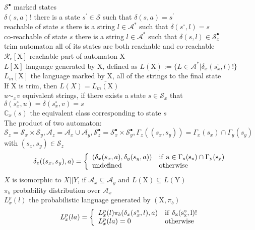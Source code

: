 \documentclass{article}
\begin{document}
$\mathcal{S}^{\bullet}$ \quad marked states\\
$\delta(s,a)!$ \quad there is a state $s^{\prime} \in \mathcal{S}$ such that $\delta(s,a)=s^{\prime}$\\
reachable of state $s$ \quad there is a string $l\in\mathcal{A}^*$ such that $\delta(s^{\circ},l)=s$\\
co-reachable of state $s$ \quad there is a string $l\in\mathcal{A}^*$ such that $\delta(s,l) \in \mathcal{S}_x^{\bullet}$\\
trim automaton \quad all of its states are both reachable and co-reachable\\
$\mathcal{R}_e[\mathrm{X}]$ \quad reachable part of automaton $\mathrm{X}$\\
$L[\mathrm{X}]$ \quad language generated by $\mathrm{X}$, defined as $L(\mathrm{X}):=\{L\in\mathcal{A}^*|\delta_x(s_x^{\circ},l)!\}$\\
$L_m[\mathrm{X}]$ \quad the language marked by $\mathrm{X}$, all of the strings to the final state \\
If $\mathrm{X}$ is trim, then $L(X)=\overline{L_m(\mathrm{X})}$\\
$u\sim_xv$ \quad equivalent strings, if there exists a state $s\in\mathcal{S}_x$ that $\delta(s^{\circ}_x,u)=\delta(s^{\circ}_x,v)=s$\\
$\mathbb{C}_x(s)$ \quad the equivalent class corresponding to state $s$\\
The product of two automaton: $\mathcal{S}_{z}=\mathcal{S}_{x}\times\mathcal{S}_{y},\mathcal{A}_{z}=\mathcal{A}_{x}\cup\mathcal{A}_{y},\mathcal{S}_{z}^{\bullet}=\mathcal{S}_{x}^{\bullet}\times\mathcal{S}_{y}^{\bullet},\Gamma_{z}((s_{x},s_{y}))=\Gamma_{x}(s_{x})\cap \Gamma_{y}(s_y)$ with $(s_x,s_y)\in\mathcal{S}_z $\\
\begin{equation}
\left.\delta_z((s_x,s_y),a)=\left\{\begin{array}{ll}
\left(\delta_x(s_x,a),\delta_y(s_y,a)\right) & \rm{if} \ a \in \Gamma_x(s_x) \cap \Gamma_y(s_y)\\
\rm{undefined}&\rm{otherwise}\end{array}
\right.\right.
\end{equation}
$X$ is isomorphic to $X||Y$, if $\mathcal{A}_x \subseteq \mathcal{A}_y$ and $L(\mathrm{X})\subseteq L(\mathrm{Y})$\\
$\pi_b$ \quad probability distribution over $\mathcal{A}_x$\\
$L_x^p(l)$ \quad the probabilistic language generated by $(\mathrm{X},\pi_b)$\\
\begin{equation}
\left.L_{x}^p(la)=\left\{\begin{array}{ll}L_{x}^p(l)\pi_b(\delta_x(s_x^{\circ},l),a)& \rm{if}\ \delta_x(s_x^{\circ},l)!\\
L_{x}^p(la)=0& \rm{otherwise}\end{array}\right.\right.
\end{equation}
\end{document}
